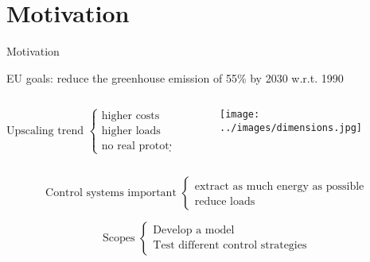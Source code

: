                                                     
\section{Motivation}
\begin{frame}{Motivation}
  \begin{myitemize}
    \item EU goals: reduce the greenhouse emission of 55\% by 2030 w.r.t. 1990
    
      \begin{columns}
        \begin{column}{0.5\columnwidth}
          \[
          \text{Upscaling trend } 
          \begin{cases}
            \text{higher costs}\\
            \text{higher loads}\\
            \text{no real prototypes} 
          \end{cases}  
          \]
        \end{column}
        \begin{column}{0.5\columnwidth}
          \begin{figure}
            \centering
            \texttt{[image: ../images/dimensions.jpg]}
          \end{figure}
        \end{column}
      \end{columns}
      
    \item
    \[
      \text{Control systems important }
      \begin{cases}
        \text{extract as much energy as possible}\\
        \text{reduce loads}
      \end{cases}
      \]

    \item \[
      \text{Scopes }
      \begin{cases}
        \text{Develop a model}\\
        \text{Test different control strategies}
      \end{cases}
      \]
        

\end{myitemize}
\end{frame}
